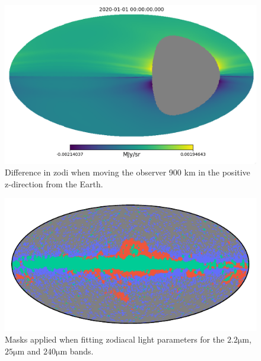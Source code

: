 \documentclass{aa}
\begin{document}
\begin{figure}
    \centering
         \includegraphics[width=\linewidth]{figs/Z+900km.png}
        \caption{Difference in zodi when moving the observer 900 km in the positive z-direction from the Earth.}
      \label{fig: z}
\end{figure}

\begin{figure}
    \centering
        \includegraphics[width=\columnwidth]{figs/mask_zodi_fitting.pdf}
        \caption{Masks applied when fitting zodiacal light parameters for the $2.2\mathrm{\mu m}$, $25\mathrm{\mu m}$ and $240\mathrm{\mu m}$ bands.}
      \label{fig:masks}
\end{figure}
\end{document}
